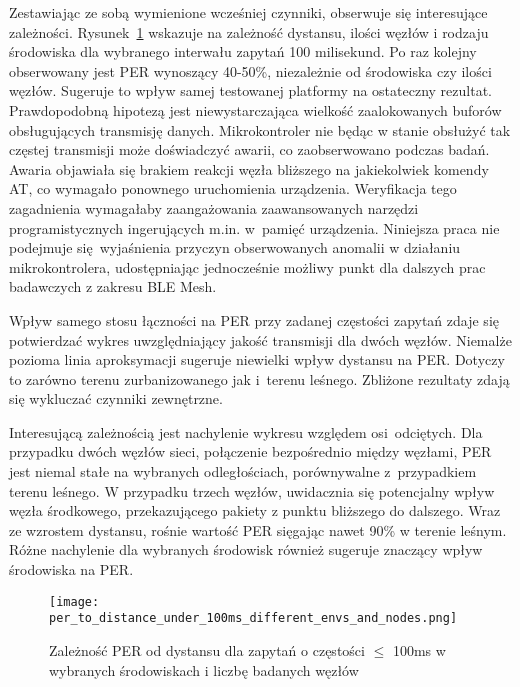 Zestawiając ze sobą wymienione wcześniej czynniki, obserwuje się interesujące zależności. Rysunek~\ref{rys:per_to_distance_under_100ms_different_envs_and_nodes} wskazuje na zależność dystansu, ilości węzłów i rodzaju
środowiska dla wybranego interwału zapytań 100 milisekund. Po raz kolejny obserwowany jest PER wynoszący
40-50\%, niezależnie od środowiska czy ilości węzłów. Sugeruje to wpływ samej testowanej platformy
na ostateczny rezultat. Prawdopodobną hipotezą jest niewystarczająca wielkość zaalokowanych
buforów obsługujących transmisję danych. Mikrokontroler nie będąc w stanie obsłużyć tak częstej transmisji
może doświadczyć awarii, co zaobserwowano podczas badań. Awaria objawiała się brakiem reakcji węzła bliższego
na jakiekolwiek komendy AT, co wymagało ponownego uruchomienia urządzenia. Weryfikacja tego zagadnienia
wymagałaby zaangażowania zaawansowanych narzędzi programistycznych ingerujących m.in. w~pamięć urządzenia.
Niniejsza praca nie podejmuje się wyjaśnienia przyczyn obserwowanych anomalii w działaniu mikrokontrolera,
udostępniając jednocześnie możliwy punkt dla dalszych prac badawczych z zakresu BLE Mesh.

Wpływ samego stosu łączności na PER przy zadanej częstości zapytań zdaje się potwierdzać wykres uwzględniający
jakość transmisji dla dwóch węzłów. Niemalże pozioma linia aproksymacji sugeruje niewielki wpływ dystansu na PER.
Dotyczy to zarówno terenu zurbanizowanego jak i~terenu leśnego. Zbliżone rezultaty zdają się wykluczać
czynniki zewnętrzne.

Interesującą zależnością jest nachylenie wykresu względem osi odciętych. Dla przypadku dwóch węzłów sieci,
połączenie bezpośrednio między węzłami, PER jest niemal stałe na wybranych odległościach, porównywalne
z~przypadkiem terenu leśnego. W przypadku trzech
węzłów, uwidacznia się potencjalny wpływ węzła środkowego, przekazującego pakiety z punktu bliższego do
dalszego. Wraz ze wzrostem dystansu, rośnie wartość PER sięgając nawet 90\% w terenie leśnym. Różne nachylenie
dla wybranych środowisk również sugeruje znaczący wpływ środowiska na PER.

\begin{figure}[!htb]
	\centering \texttt{[image: per\_to\_distance\_under\_100ms\_different\_envs\_and\_nodes.png]}
	\caption{Zależność \gls{PER} od dystansu dla zapytań o częstości $\leqslant$ 100ms w wybranych środowiskach i liczbę badanych węzłów}
	\label{rys:per_to_distance_under_100ms_different_envs_and_nodes}
\end{figure}

